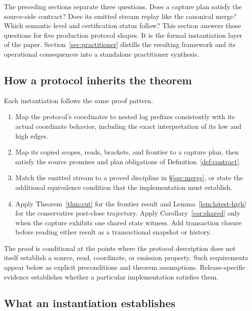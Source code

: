 \documentclass[sigconf,nonacm,10pt]{acmart}
\theoremstyle{plain}
\theoremstyle{definition}
\begin{document}
The preceding sections separate three questions. Does a capture plan
satisfy the source-side contract? Does its emitted stream replay like
the canonical merge? Which semantic level and certification status
follow? This section answers
those questions for five production protocol shapes. It is the formal
instantiation layer of the paper. Section~\ref{sec:practitioner}
distills the resulting framework and its operational consequences into
a standalone practitioner synthesis.

\subsection{How a protocol inherits the theorem}
\label{sec:instances-pattern}

Each instantiation follows the same proof pattern.

\begin{enumerate}
\item Map the protocol's coordinates to nested log prefixes consistently
with its actual coordinate behavior, including the exact interpretation
of its low and high edges.
\item Map its copied scopes, reads, brackets, and frontier to a capture
plan, then satisfy the source promises and plan obligations of
Definition~\ref{def:contract}.
\item Match the emitted stream to a proved discipline in
\S\ref{sec:merge}, or state the additional equivalence condition that
the implementation must establish.
\item Apply Theorem~\ref{thm:cut} for the frontier result and
Lemma~\ref{lem:latest-high} for the conservative post-close
trajectory. Apply Corollary~\ref{cor:shared} only when the capture
exhibits one shared state witness. Add transaction closure before
reading either result as a transactional snapshot or history.
\end{enumerate}

The proof is conditional at the points where the protocol
description does not itself establish a source, read, coordinate, or
emission property. Such requirements appear below as explicit preconditions
and theorem assumptions. Release-specific evidence establishes whether a
particular implementation satisfies them.

\subsection{What an instantiation establishes}
\label{sec:instances-meaning}
\end{document}
